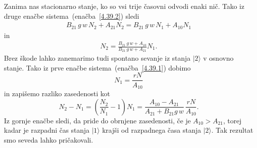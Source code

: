 Zanima nas stacionarno stanje, ko so vsi trije časovni odvodi enaki nič. 
Tako iz druge enačbe sistema~(enačba~\ref{4.39.2}) sledi
\begin{eqnarray}
B_{21}\,g\,w\, N_{2}+A_{21}N_{2} = B_{21}\,g\,w\, N_{1} + A_{10}N_{1} 
\end{eqnarray}
in
\begin{eqnarray}
N_2 = \frac{B_{21}\,g\,w + A_{10}}{B_{21}\,g\,w+A_{21}}N_1.  
\end{eqnarray}
Brez škode lahko zanemarimo tudi spontano sevanje iz stanja
$|2\rangle$ v osnovno stanje. Tako iz prve enačbe sistema~(enačba~\ref{4.39.1}) dobimo
\begin{equation}
N_1= \frac{rN}{A_{10}}
\end{equation}
in zapišemo razliko zasedenosti kot 
\begin{equation}
N_{2}-N_{1}=\left(\frac{N_2}{N_1}-1\right)N_1=\frac{A_{10}-A_{21}}{A_{21}+
B_{21}g\,w} \,\frac{rN}{A_{10}}.
\label{4.42}
\end{equation}
Iz gornje enačbe sledi, da pride do obrnjene 
zasedenosti, če je $A_{10}>A_{21}$, torej kadar je
razpadni čas stanja $|1\rangle$ krajši od razpadnega časa stanja $|2\rangle$.
Tak rezultat smo seveda lahko pričakovali.

